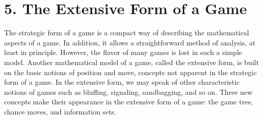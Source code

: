 \section{5. The Extensive Form of a Game}
The strategic form of a game is a compact way of describing the mathematical aspects
of a game. In addition, it allows a straightforward method of analysis, at least in principle.
However, the flavor of many games is lost in such a simple model. Another mathematical
model of a game, called the extensive form, is built on the basic notions of position and
move, concepts not apparent in the strategic form of a game. In the extensive form, we
may speak of other characteristic notions of games such as bluffing, signaling, sandbagging,
and so on. Three new concepts make their appearance in the extensive form of a game:
the game tree, chance moves, and information sets.
